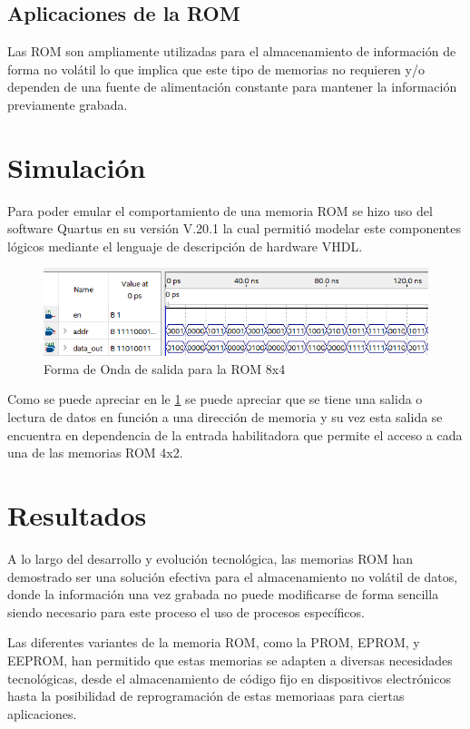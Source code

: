 \documentclass[stu, 10pt, floatsintext]{apa7}
\begin{document}
	\subsection{Aplicaciones de la ROM}
	Las ROM son ampliamente utilizadas para el almacenamiento de información de forma no volátil lo que implica que este tipo de memorias no requieren y/o dependen de una fuente de alimentación constante para mantener la información previamente grabada.
	
	\section{Simulación}
	Para poder emular el comportamiento de una memoria ROM se hizo uso del software Quartus en su versión V.20.1 la cual permitió modelar este componentes lógicos mediante el lenguaje de descripción de hardware VHDL.
	
	\begin{figure}
		\centering
		\includegraphics[width=0.7\linewidth]{media/rom8x4-forma-onda}
		\caption{Forma de Onda de salida para la ROM 8x4}
		\label{fig:rom8x4-forma-onda}
	\end{figure}
	
	Como se puede apreciar en le \ref{fig:rom8x4-forma-onda} se puede apreciar que se tiene una salida o lectura de datos en función a una dirección de memoria y su vez esta salida se encuentra en dependencia de la entrada habilitadora que permite el acceso a cada una de las memorias ROM 4x2.
	
	\section{Resultados}
	A lo largo del desarrollo y evolución tecnológica, las memorias ROM han demostrado ser una solución efectiva para el almacenamiento no volátil de datos, donde la información una vez grabada no puede modificarse de forma sencilla siendo necesario para este proceso el uso de procesos específicos.
	
	Las diferentes variantes de la memoria ROM, como la PROM, EPROM, y EEPROM, han permitido que estas memorias se adapten a diversas necesidades tecnológicas, desde el almacenamiento de código fijo en dispositivos electrónicos hasta la posibilidad de reprogramación de estas memoriaas para ciertas aplicaciones.
	
\end{document}
